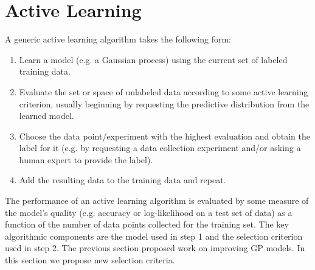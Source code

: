 \documentclass[prd,nofootbib,floatfix,11pt,tightenlines]{revtex4}
\begin{document}
\section{Active Learning}
\label{sec:active_learning}

A generic active learning algorithm takes the following form:

\vspace{.5\baselineskip}
\begin{enumerate}

\item Learn a model (e.g. a Gaussian process) using the current set of
  labeled training data.

\item Evaluate the set or space of unlabeled data according to some active
  learning criterion, usually beginning by requesting the predictive
  distribution from the learned model.

\item Choose the data point/experiment with the highest evaluation and
  obtain the label for it (e.g. by requesting a data collection experiment
  and/or asking a human expert to provide the label).

\item Add the resulting data to the training data and repeat.

\end{enumerate}
\vspace{.5\baselineskip}

The performance of an active learning algorithm is evaluated by some
measure of the model's quality (e.g. accuracy or log-likelihood on a test
set of data) as a function of the number of data points collected for the
training set.  The key algorithmic components are the model used in step 1
and the selection criterion used in step 2.  The previous section proposed
work on improving GP models.  In this section we propose new selection
criteria.


\end{document}

